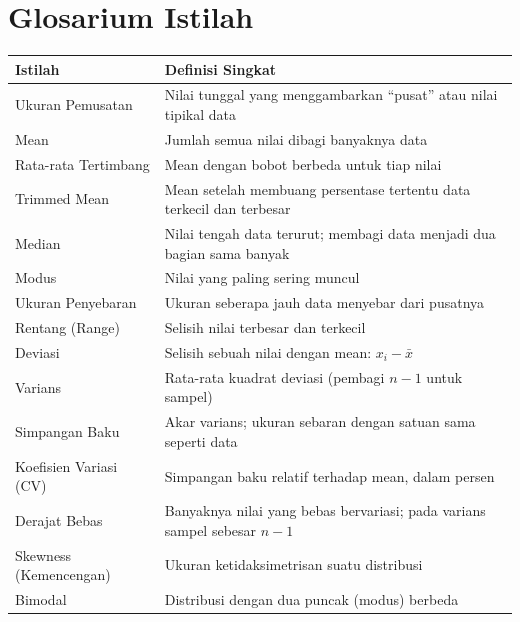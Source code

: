 \documentclass[
  indonesian,
  letterpaper,
]{book}
\newcounter{none} %
\begin{document}
\section{Glosarium Istilah}\label{glosarium-istilah-4}

{\def\LTcaptype{none} %
\begin{longtable}[]{@{}
  >{\raggedright\arraybackslash}p{}
  >{\raggedright\arraybackslash}p{}@{}}
\toprule\noalign{}
\begin{minipage}[b]{\linewidth}\raggedright
Istilah
\end{minipage} & \begin{minipage}[b]{\linewidth}\raggedright
Definisi Singkat
\end{minipage} \\
\midrule\noalign{}
\endhead
\bottomrule\noalign{}
\endlastfoot
Ukuran Pemusatan & Nilai tunggal yang menggambarkan ``pusat'' atau nilai
tipikal data \\
Mean & Jumlah semua nilai dibagi banyaknya data \\
Rata-rata Tertimbang & Mean dengan bobot berbeda untuk tiap nilai \\
Trimmed Mean & Mean setelah membuang persentase tertentu data terkecil
dan terbesar \\
Median & Nilai tengah data terurut; membagi data menjadi dua bagian sama
banyak \\
Modus & Nilai yang paling sering muncul \\
Ukuran Penyebaran & Ukuran seberapa jauh data menyebar dari pusatnya \\
Rentang (Range) & Selisih nilai terbesar dan terkecil \\
Deviasi & Selisih sebuah nilai dengan mean: \(x_i - \bar{x}\) \\
Varians & Rata-rata kuadrat deviasi (pembagi \(n-1\) untuk sampel) \\
Simpangan Baku & Akar varians; ukuran sebaran dengan satuan sama seperti
data \\
Koefisien Variasi (CV) & Simpangan baku relatif terhadap mean, dalam
persen \\
Derajat Bebas & Banyaknya nilai yang bebas bervariasi; pada varians
sampel sebesar \(n-1\) \\
Skewness (Kemencengan) & Ukuran ketidaksimetrisan suatu distribusi \\
Bimodal & Distribusi dengan dua puncak (modus) berbeda \\

\end{longtable}}
\end{document}
